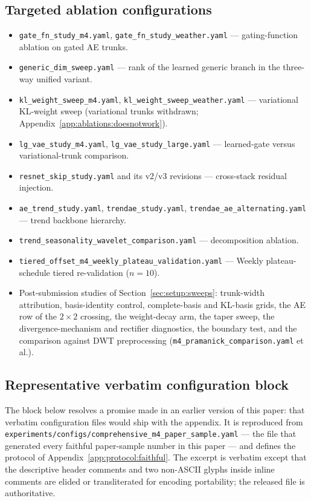 \subsection{Targeted ablation configurations}
\label{app:configs:ablations}

\begin{itemize}\itemsep -1pt
\item \texttt{gate\_fn\_study\_m4.yaml},
      \texttt{gate\_fn\_study\_weather.yaml} --- gating-function ablation on
      gated AE trunks.
\item \texttt{generic\_dim\_sweep.yaml} --- rank of the learned generic
      branch in the three-way unified variant.
\item \texttt{kl\_weight\_sweep\_m4.yaml},
      \texttt{kl\_weight\_sweep\_weather.yaml} --- variational KL-weight
      sweep (variational trunks withdrawn;
      Appendix~\ref{app:ablations:doesnotwork}).
\item \texttt{lg\_vae\_study\_m4.yaml}, \texttt{lg\_vae\_study\_large.yaml}
      --- learned-gate versus variational-trunk comparison.
\item \texttt{resnet\_skip\_study.yaml} and its v2/v3 revisions ---
      cross-stack residual injection.
\item \texttt{ae\_trend\_study.yaml}, \texttt{trendae\_study.yaml},
      \texttt{trendae\_ae\_alternating.yaml} --- trend backbone hierarchy.
\item \texttt{trend\_seasonality\_wavelet\_comparison.yaml} ---
      decomposition ablation.
\item \texttt{tiered\_offset\_m4\_weekly\_plateau\_validation.yaml} ---
      Weekly plateau-schedule tiered re-validation ($n = 10$).
\item Post-submission studies of Section~\ref{sec:setup:sweeps}:
      trunk-width attribution, basis-identity control, complete-basis and
      KL-basis grids, the AE row of the $2\times2$ crossing, the
      weight-decay arm, the taper sweep, the divergence-mechanism and
      rectifier diagnostics, the boundary test, and the comparison against
      DWT preprocessing (\texttt{m4\_pramanick\_comparison.yaml} et al.).
\end{itemize}

\subsection{Representative verbatim configuration block}
\label{app:configs:yaml}

The block below resolves a promise made in an earlier version of this
paper: that verbatim configuration files would ship with the appendix. It
is reproduced from
\texttt{experiments/configs/comprehensive\_m4\_paper\_sample.yaml} --- the
file that generated every faithful paper-sample number in this paper ---
and defines the protocol of Appendix~\ref{app:protocol:faithful}. The
excerpt is verbatim except that the descriptive header comments and two
non-ASCII glyphs inside inline comments are elided or transliterated for
encoding portability; the released file is authoritative.


